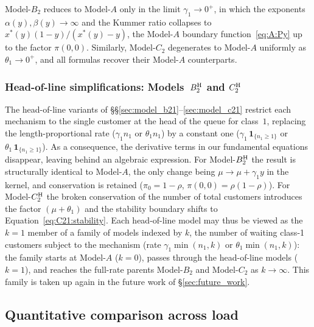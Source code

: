 Model-$B_2$ reduces to Model-$A$ only in the limit $\gamma_1\to0^+$, in which the exponents $\alpha(y),\beta(y)\to\infty$ and the Kummer ratio collapses to $x^*(y)(1-y)/(x^*(y)-y)$, the Model-$A$ boundary function~\eqref{eq:A:Py} up to the factor $\pi(0,0)$. Similarly, \mbox{Model-$C_2$} degenerates to Model-$A$ uniformly
as $\theta_1\to0^+$, and all formulas recover their Model-$A$ counterparts.


\subsubsection*{Head-of-line simplifications: Models~\texorpdfstring{$B_2^{\mathrm{H}}$}{BH} and \texorpdfstring{$C_2^{\mathrm{H}}$}{CH}}



The head-of-line variants of \S\S\ref{sec:model_b21}--\ref{sec:model_c21} restrict each mechanism to the single customer at the head of the queue for class~$1$, replacing the length-proportional rate ($\gamma_1 n_1$ or $\theta_1 n_1$) by a constant one ($\gamma_1\,\mathbf{1}_{\{n_1\ge1\}}$ or $\theta_1\,\mathbf{1}_{\{n_1\ge1\}}$). As a consequence, the derivative terms in our fundamental equations disappear, leaving behind an algebraic expression.  For Model-$B_2^{\mathrm{H}}$ the result is structurally identical to Model-$A$, the only change being $\mu\to\mu+\gamma_1 y$ in the kernel, and conservation is retained ($\pi_0=1-\rho$, $\pi(0,0)=\rho(1-\rho)$). For Model-$C_2^{\mathrm{H}}$ the broken conservation of the number of total customers introduces the factor $(\mu+\theta_1)$ and the stability boundary shifts to Equation~\eqref{eq:C21:stability}. Each head-of-line model may thus be viewed as the $k=1$ member of a family of models indexed by $k$, the number of waiting class-1 customers subject to the mechanism (rate $\gamma_1\min(n_1,k)$ or $\theta_1\min(n_1,k)$): the family starts at Model-$A$ ($k=0$), passes through the head-of-line models ($k=1$), and reaches the full-rate parents Model-$B_2$ and Model-$C_2$ as $k\to\infty$. This family is taken up again in the future work of \S\ref{sec:future_work}.

\subsection{Quantitative comparison across load}
\label{subsec:comp:sweep}

